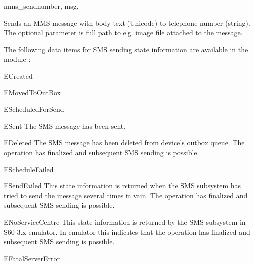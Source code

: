 \begin{funcdesc}{mms_send}{number, msg, }

Sends an MMS message with body text  (Unicode) to telephone number 
 (string). The optional parameter  is full path 
to e.g. image file attached to the message.

\end{funcdesc}

The following data items for SMS sending state information are available in 
the module :

\begin{datadesc}{ECreated}
\end{datadesc}

\begin{datadesc}{EMovedToOutBox}
\end{datadesc}

\begin{datadesc}{EScheduledForSend}
\end{datadesc}

\begin{datadesc}{ESent}
The SMS message has been sent.
\end{datadesc}

\begin{datadesc}{EDeleted}
The SMS message has been deleted from device's outbox queue. The 
 operation has finalized and subsequent SMS sending is possible.
\end{datadesc}

\begin{datadesc}{EScheduleFailed}
\end{datadesc}

\begin{datadesc}{ESendFailed}
This state information is returned when the SMS subsystem has tried to send the message 
several times in vain. The  operation has finalized and 
subsequent SMS sending is possible.
\end{datadesc}

\begin{datadesc}{ENoServiceCentre}
This state information is returned by the SMS subsystem in S60 3.x emulator. In 
emulator this indicates that the  operation has finalized and 
subsequent SMS sending is possible.
\end{datadesc}

\begin{datadesc}{EFatalServerError}
\end{datadesc}

